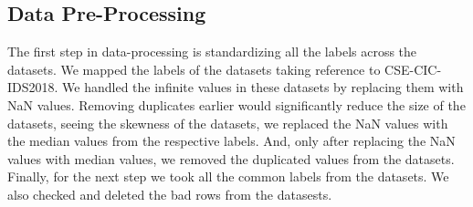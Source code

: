 \subsection{Data Pre-Processing}
The first step in data-processing is standardizing all the labels across the datasets. We mapped the labels of the datasets taking reference to 
CSE-CIC-IDS2018. We handled the infinite values in these datasets by replacing them with NaN values. Removing duplicates earlier would significantly 
reduce the size of the datasets, seeing the skewness of the datasets, we replaced the NaN values with the median values from the respective labels. 
And, only after replacing the NaN values with median values, we removed the duplicated values from the datasets. Finally, for the next step we took 
all the common labels from the datasets. We also checked and deleted the bad rows from the datasests.

